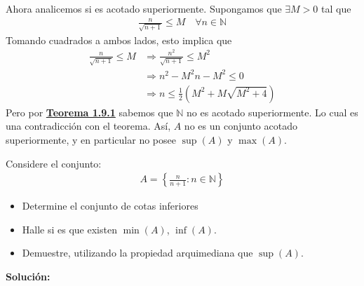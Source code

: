 \documentclass[12pt]{book}
\begin{document}
Ahora analicemos si es acotado superiormente. Supongamos que $\exists M >0$ tal que 
\begin{align*}
    \frac{n}{\sqrt{n+1}} \leq M \quad \forall n \in \mathbb{N}
\end{align*}
Tomando cuadrados a ambos lados, esto implica que
\begin{align*}
      \frac{n}{\sqrt{n+1}} \leq M &\Longrightarrow \frac{n^2}{\sqrt{n+1}} \leq M^2 \\
      &\Longrightarrow n^2-M^2n-M^2\leq 0 \\
      &\Longrightarrow n \leq \frac{1}{2}(M^2+M \sqrt{M^2+4})
\end{align*}
Pero por \hyperref[th:teo1.9.1]{\textbf{Teorema 1.9.1}} sabemos que $\mathbb{N}$ no es acotado superiormente. Lo cual es una contradicción con el teorema. Así, $A$ no es un conjunto acotado superiormente, y en particular no posee $\sup(A)$ y $\max(A)$.
\begin{prob}{}{}
    Considere el conjunto:
\begin{align*}
    A=\left\{\frac{n}{n+1} : n \in \mathbb{N} \right\}
\end{align*}
\begin{itemize}
    \item[\textbf{a)}] Determine el conjunto de cotas inferiores
     \item[\textbf{b)}] Halle si es que existen $\min(A)$, $\inf(A)$.
     \item[\textbf{c)}] Demuestre, utilizando la propiedad arquimediana que $\sup(A)$.
\end{itemize}
\end{prob}
\textbf{Solución:}
\end{document}
